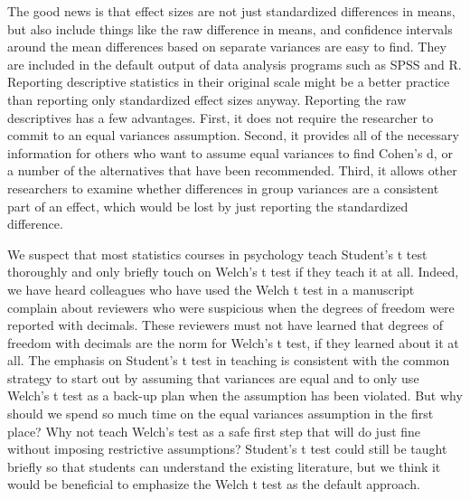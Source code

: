 \documentclass[man,a4paper,noextraspace,apacite]{apa6}
\begin{document}
    The good news is that effect sizes are not just standardized differences in means, but also include things like the raw difference in means, and confidence intervals around the mean differences based on separate variances are easy to find. They are included in the default output of data analysis programs such as SPSS and R. Reporting descriptive statistics in their original scale might be a better practice than reporting only standardized effect sizes anyway. Reporting the raw descriptives has a few advantages. First, it does not require the researcher to commit to an equal variances assumption. Second, it provides all of the necessary information for others who want to assume equal variances to find Cohen's d, or a number of the alternatives that have been recommended. Third, it allows other researchers to examine whether differences in group variances are a consistent part of an effect, which would be lost by just reporting the standardized difference.

    We suspect that most statistics courses in psychology teach Student's t test thoroughly and only briefly touch on Welch's t test if they teach it at all. Indeed, we have heard colleagues who have used the Welch t test in a manuscript complain about reviewers who were suspicious when the degrees of freedom were reported with decimals. These reviewers must not have learned that degrees of freedom with decimals are the norm for Welch's t test, if they learned about it at all. The emphasis on Student's t test in teaching is consistent with the common strategy to start out by assuming that variances are equal and to only use Welch's t test as a back-up plan when the assumption has been violated. But why should we spend so much time on the equal variances assumption in the first place? Why not teach Welch's test as a safe first step that will do just fine without imposing restrictive assumptions? Student's t test could still be taught briefly so that students can understand the existing literature, but we think it would be beneficial to emphasize the Welch t test as the default approach. 






\end{document}
